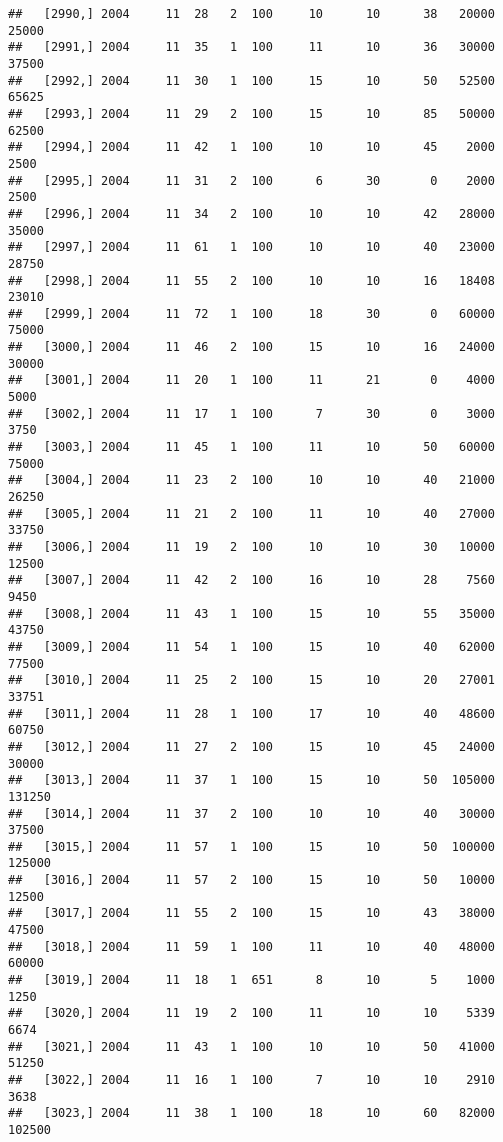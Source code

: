 \documentclass{article}\usepackage[]{graphicx}\usepackage[]{color}
\makeatletter
\newenvironment{kframe}{%
 \def\at@end@of@kframe{}%
 \ifinner\ifhmode%
  \def\at@end@of@kframe{\end{minipage}}%
  \begin{minipage}{\columnwidth}%
 \fi\fi%
 \def\FrameCommand##1{\hskip\@totalleftmargin \hskip-\fboxsep
 \colorbox{shadecolor}{##1}\hskip-\fboxsep
     \hskip-\linewidth \hskip-\@totalleftmargin \hskip\columnwidth}%
 \MakeFramed {\advance\hsize-\width
   \@totalleftmargin\z@ \linewidth\hsize
   \@setminipage}}%
 {\par\unskip\endMakeFramed%
 \at@end@of@kframe}
\newenvironment{knitrout}{}{} %
\makeatother
\begin{document}
\begin{knitrout}
\begin{kframe}
\begin{verbatim}
##   [2990,] 2004     11  28   2  100     10      10      38   20000   25000
##   [2991,] 2004     11  35   1  100     11      10      36   30000   37500
##   [2992,] 2004     11  30   1  100     15      10      50   52500   65625
##   [2993,] 2004     11  29   2  100     15      10      85   50000   62500
##   [2994,] 2004     11  42   1  100     10      10      45    2000    2500
##   [2995,] 2004     11  31   2  100      6      30       0    2000    2500
##   [2996,] 2004     11  34   2  100     10      10      42   28000   35000
##   [2997,] 2004     11  61   1  100     10      10      40   23000   28750
##   [2998,] 2004     11  55   2  100     10      10      16   18408   23010
##   [2999,] 2004     11  72   1  100     18      30       0   60000   75000
##   [3000,] 2004     11  46   2  100     15      10      16   24000   30000
##   [3001,] 2004     11  20   1  100     11      21       0    4000    5000
##   [3002,] 2004     11  17   1  100      7      30       0    3000    3750
##   [3003,] 2004     11  45   1  100     11      10      50   60000   75000
##   [3004,] 2004     11  23   2  100     10      10      40   21000   26250
##   [3005,] 2004     11  21   2  100     11      10      40   27000   33750
##   [3006,] 2004     11  19   2  100     10      10      30   10000   12500
##   [3007,] 2004     11  42   2  100     16      10      28    7560    9450
##   [3008,] 2004     11  43   1  100     15      10      55   35000   43750
##   [3009,] 2004     11  54   1  100     15      10      40   62000   77500
##   [3010,] 2004     11  25   2  100     15      10      20   27001   33751
##   [3011,] 2004     11  28   1  100     17      10      40   48600   60750
##   [3012,] 2004     11  27   2  100     15      10      45   24000   30000
##   [3013,] 2004     11  37   1  100     15      10      50  105000  131250
##   [3014,] 2004     11  37   2  100     10      10      40   30000   37500
##   [3015,] 2004     11  57   1  100     15      10      50  100000  125000
##   [3016,] 2004     11  57   2  100     15      10      50   10000   12500
##   [3017,] 2004     11  55   2  100     15      10      43   38000   47500
##   [3018,] 2004     11  59   1  100     11      10      40   48000   60000
##   [3019,] 2004     11  18   1  651      8      10       5    1000    1250
##   [3020,] 2004     11  19   2  100     11      10      10    5339    6674
##   [3021,] 2004     11  43   1  100     10      10      50   41000   51250
##   [3022,] 2004     11  16   1  100      7      10      10    2910    3638
##   [3023,] 2004     11  38   1  100     18      10      60   82000  102500

\end{verbatim}
\end{kframe}
\end{knitrout}
\end{document}
